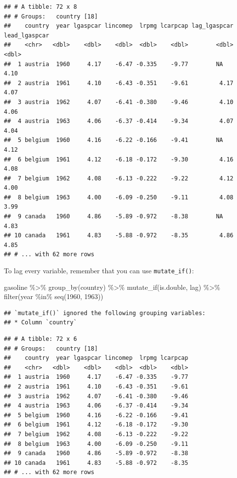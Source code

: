 \documentclass[
]{article}
\newenvironment{Shaded}{\begin{snugshade}}{\end{snugshade}}
\newcommand{\DecValTok}[1]{\textcolor[rgb]{0.00,0.00,0.81}{#1}}
\newcommand{\FunctionTok}[1]{\textcolor[rgb]{0.00,0.00,0.00}{#1}}
\newcommand{\NormalTok}[1]{#1}
\newcommand{\SpecialCharTok}[1]{\textcolor[rgb]{0.00,0.00,0.00}{#1}}
\begin{document}
\begin{verbatim}
## # A tibble: 72 x 8
## # Groups:   country [18]
##    country  year lgaspcar lincomep  lrpmg lcarpcap lag_lgaspcar lead_lgaspcar
##    <chr>   <dbl>    <dbl>    <dbl>  <dbl>    <dbl>        <dbl>         <dbl>
##  1 austria  1960     4.17    -6.47 -0.335    -9.77        NA             4.10
##  2 austria  1961     4.10    -6.43 -0.351    -9.61         4.17          4.07
##  3 austria  1962     4.07    -6.41 -0.380    -9.46         4.10          4.06
##  4 austria  1963     4.06    -6.37 -0.414    -9.34         4.07          4.04
##  5 belgium  1960     4.16    -6.22 -0.166    -9.41        NA             4.12
##  6 belgium  1961     4.12    -6.18 -0.172    -9.30         4.16          4.08
##  7 belgium  1962     4.08    -6.13 -0.222    -9.22         4.12          4.00
##  8 belgium  1963     4.00    -6.09 -0.250    -9.11         4.08          3.99
##  9 canada   1960     4.86    -5.89 -0.972    -8.38        NA             4.83
## 10 canada   1961     4.83    -5.88 -0.972    -8.35         4.86          4.85
## # ... with 62 more rows
\end{verbatim}

To lag every variable, remember that you can use \texttt{mutate\_if()}:

\begin{Shaded}
\begin{Highlighting}[]
\NormalTok{gasoline }\SpecialCharTok{\%\textgreater{}\%}
  \FunctionTok{group\_by}\NormalTok{(country) }\SpecialCharTok{\%\textgreater{}\%}
  \FunctionTok{mutate\_if}\NormalTok{(is.double, lag) }\SpecialCharTok{\%\textgreater{}\%}
  \FunctionTok{filter}\NormalTok{(year }\SpecialCharTok{\%in\%} \FunctionTok{seq}\NormalTok{(}\DecValTok{1960}\NormalTok{, }\DecValTok{1963}\NormalTok{))}
\end{Highlighting}
\end{Shaded}

\begin{verbatim}
## `mutate_if()` ignored the following grouping variables:
## * Column `country`
\end{verbatim}

\begin{verbatim}
## # A tibble: 72 x 6
## # Groups:   country [18]
##    country  year lgaspcar lincomep  lrpmg lcarpcap
##    <chr>   <dbl>    <dbl>    <dbl>  <dbl>    <dbl>
##  1 austria  1960     4.17    -6.47 -0.335    -9.77
##  2 austria  1961     4.10    -6.43 -0.351    -9.61
##  3 austria  1962     4.07    -6.41 -0.380    -9.46
##  4 austria  1963     4.06    -6.37 -0.414    -9.34
##  5 belgium  1960     4.16    -6.22 -0.166    -9.41
##  6 belgium  1961     4.12    -6.18 -0.172    -9.30
##  7 belgium  1962     4.08    -6.13 -0.222    -9.22
##  8 belgium  1963     4.00    -6.09 -0.250    -9.11
##  9 canada   1960     4.86    -5.89 -0.972    -8.38
## 10 canada   1961     4.83    -5.88 -0.972    -8.35
## # ... with 62 more rows
\end{verbatim}
\end{document}
